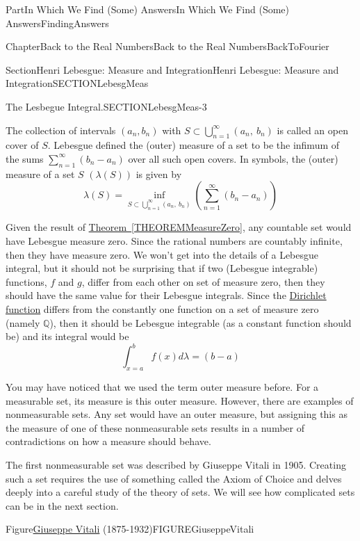 \documentclass[oneside,10pt,]{book}
\newcommand{\xreffont}{\relax}
\numberwithin{equation}{part}
\newcommand{\QQ}{\mathbb {Q}}
\begin{document}
\begin{partptx}{Part}{In Which We Find (Some) Answers}{}{In Which We Find (Some) Answers}{}{}{FindingAnswers}
\begin{chapterptx}{Chapter}{Back to the Real Numbers}{}{Back to the Real Numbers}{}{}{BackToFourier}
\begin{sectionptx}{Section}{Henri Lebesgue: Measure and Integration}{}{Henri Lebesgue: Measure and Integration}{}{}{SECTIONLebesgMeas}
\begin{paragraphs}{The Lesbegue Integral.}{SECTIONLebesgMeas-3}
\par
The collection of intervals \((a_n,b_n)\) with \(S\subset
\bigcup^{\infty }_{n=1}{\left(a_n,\ b_n\right)}\) is called an open cover of \(S\).  Lebesgue defined the (outer) measure of a set to be the infimum of the sums \(\sum^{\infty
}_{n=1}{\left(b_n-a_n\right)}\) over all such open covers. In symbols, the (outer) measure of a set \(S\) \(\left(\lambda \left(S\right)\right)\) is given by%
\begin{equation*}
\lambda(S)=\inf_{S\subset \bigcup^{\infty}_{n=1}{(a_n,\ b_n)}} \left(\sum^{\infty }_{n=1}{\left(b_n-a_n\right)}\right) 
\end{equation*}
%
\par
Given the result of \hyperref[THEOREMMeasureZero]{Theorem~{\xreffont\ref{THEOREMMeasureZero}}}, any countable set would have Lebesgue measure zero.  Since the rational numbers are countably infinite, then they have measure zero.  We won't get into the details of a Lebesgue integral, but it should not be surprising that if two (Lebesgue integrable) functions, \(f\) and \(g\), differ from each other on set of measure zero, then they should have the same value for their Lebesgue integrals.  Since the \hyperref[PROBLEMDiricheletCountrExamp]{Dirichlet function} differs from the constantly one function on a set of measure zero (namely \(\QQ\)), then it should be Lebesgue integrable (as a constant function should be) and its integral would be%
\begin{equation*}
\int^b_{x=a}{f\left(x\right)d\lambda =\left(b-a\right)}
\end{equation*}
%
\par
You may have noticed that we used the term outer measure before. For a measurable set, its measure is this outer measure.  However, there are examples of non\textendash{}measurable sets.  Any set would have an outer measure, but assigning this as the measure of one of these non\textendash{}measurable sets results in a number of contradictions on how a measure should behave.%
\par
The first non\textendash{}measurable set was described by Giuseppe Vitali  in 1905.  Creating such a set requires the use of something called the Axiom of Choice and delves deeply into a careful study of the theory of sets.  We will see how complicated sets can be in the next section.%
\begin{figureptx}{Figure}{\href{https://mathshistory.st-andrews.ac.uk/Biographies/Vitali/}{Giuseppe Vitali} (1875-1932)}{FIGUREGiuseppeVitali}{}%
%

\end{figureptx}
\end{paragraphs}
\end{sectionptx}
\end{chapterptx}
\end{partptx}
\end{document}

